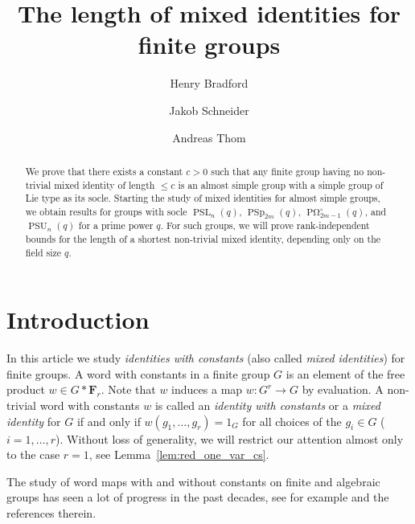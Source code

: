 \documentclass[a4paper,11pt]{amsproc}
\title[Mixed identities for finite groups]{The length of mixed identities for finite groups}
\author{Henry Bradford}
\author{Jakob Schneider}
\author{Andreas Thom}
\DeclareMathOperator{\PSp}{PSp}%
\DeclareMathOperator{\PSU}{PSU}%
\DeclareMathOperator{\POmega}{P\Omega}
\newcommand{\freegrp}{\mathbf F}%
\DeclareMathOperator{\PSL}{PSL}%
\theoremstyle{plain}
\theoremstyle{definition}
\begin{document}
	\begin{abstract}
		We prove that there exists a constant $c>0$ such that any finite group having no non-trivial mixed identity of length $\leq c$ is an almost simple group with a simple group of Lie type as its socle. Starting the study of mixed identities for almost simple groups, we obtain results for groups with socle $\PSL_n(q)$, $\PSp_{2m}(q)$, $\POmega_{2m-1}^\circ(q)$, and $\PSU_n(q)$ for a prime power $q$. For such groups, we will prove rank-independent bounds for the length of a shortest non-trivial mixed identity, depending only on the field size $q$.
	\end{abstract}
	
	\maketitle
	
	\tableofcontents
	
	\section{Introduction}
	
	In this article we study \emph{identities with constants}  
	(also called \emph{mixed identities}) for finite groups. A word with constants in a finite group $G$ is an element of the free product $w\in G\ast\freegrp_r$. Note  that $w$ induces a map $w\colon G^r\to G$ by evaluation. A non-trivial word with constants $w$ is called an \emph{identity with constants} or a \emph{mixed identity} for $G$ if and only if $w(g_1,\ldots,g_r)=1_G$ for all choices of the $g_i\in G$ ($i=1,\ldots,r$). Without loss of generality, we will restrict our attention almost only to the case $r=1$, see Lemma~\ref{lem:red_one_var_cs}.
	
	The study of word maps with and without constants on finite and algebraic groups has seen a lot of progress in the past decades, see for example \cites{elkasapythom2014goto, gordeevkunyavskiiplotkin2016word, gordeevkunyavskiiplotkin2018word, guralnickliebeckobrienshalevtiep2018surjective, klyachkothom2017new, larsen2004word, larsenshalev2009word, larsenshalevtiep2012waring, lubotzky2014images, nikolovschneiderthom2018some, schneiderthom2022word, schneiderthom2021word, schneider2019phd, thom2017length,bradford2019short, bradford2019lie, gordeev1997freedom} and the references therein.
	
\end{document}
